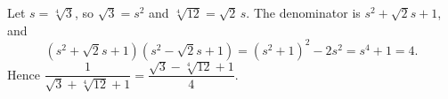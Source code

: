 Let $s=\sqrt[4]3$, so $\sqrt3=s^2$ and $\sqrt[4]{12}=\sqrt2\,s$. The denominator is $s^2+\sqrt2s+1$, and
\[\left(s^2+\sqrt2s+1\right)\left(s^2-\sqrt2s+1\right)=\left(s^2+1\right)^2-2s^2=s^4+1=4.\]
Hence $\dfrac{1}{\sqrt3+\sqrt[4]{12}+1}=\boxed{\dfrac{\sqrt3-\sqrt[4]{12}+1}{4}}$.
